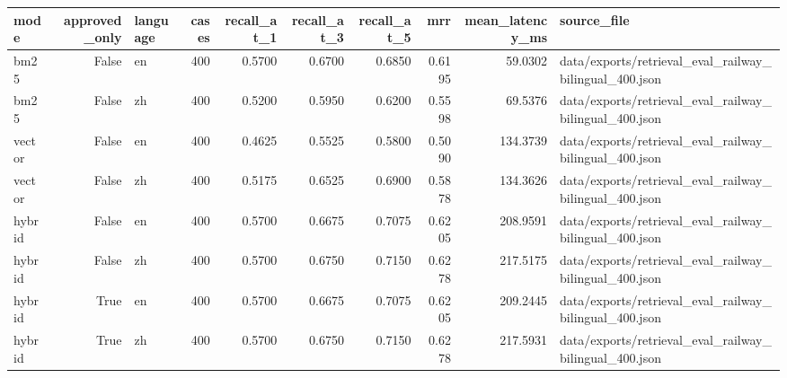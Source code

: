 \begin{tabular}{lrlrrrrrrl}
\toprule
mode & approved_only & language & cases & recall_at_1 & recall_at_3 & recall_at_5 & mrr & mean_latency_ms & source_file \\
\midrule
bm25 & False & en & 400 & 0.5700 & 0.6700 & 0.6850 & 0.6195 & 59.0302 & data/exports/retrieval_eval_railway_bilingual_400.json \\
bm25 & False & zh & 400 & 0.5200 & 0.5950 & 0.6200 & 0.5598 & 69.5376 & data/exports/retrieval_eval_railway_bilingual_400.json \\
vector & False & en & 400 & 0.4625 & 0.5525 & 0.5800 & 0.5090 & 134.3739 & data/exports/retrieval_eval_railway_bilingual_400.json \\
vector & False & zh & 400 & 0.5175 & 0.6525 & 0.6900 & 0.5878 & 134.3626 & data/exports/retrieval_eval_railway_bilingual_400.json \\
hybrid & False & en & 400 & 0.5700 & 0.6675 & 0.7075 & 0.6205 & 208.9591 & data/exports/retrieval_eval_railway_bilingual_400.json \\
hybrid & False & zh & 400 & 0.5700 & 0.6750 & 0.7150 & 0.6278 & 217.5175 & data/exports/retrieval_eval_railway_bilingual_400.json \\
hybrid & True & en & 400 & 0.5700 & 0.6675 & 0.7075 & 0.6205 & 209.2445 & data/exports/retrieval_eval_railway_bilingual_400.json \\
hybrid & True & zh & 400 & 0.5700 & 0.6750 & 0.7150 & 0.6278 & 217.5931 & data/exports/retrieval_eval_railway_bilingual_400.json \\
\bottomrule
\end{tabular}
